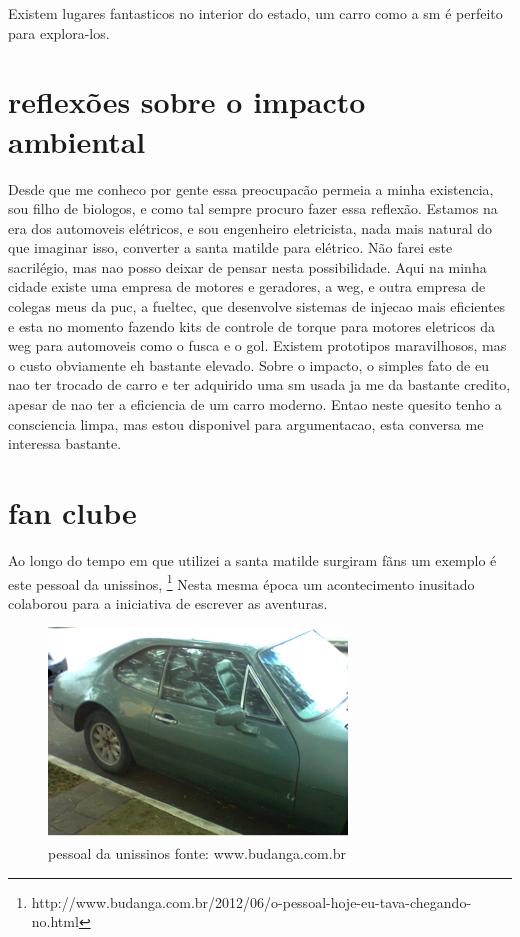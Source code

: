 \documentclass[a4paper]{report}
\begin{document}
Existem lugares fantasticos no interior do estado, um carro como a sm \'e perfeito para explora-los.


\section*{reflex\~oes sobre o impacto ambiental}

Desde que me conheco por gente essa preocupac\~ao permeia a minha existencia, sou filho de biologos, e como tal
sempre procuro fazer essa reflex\~ao.
Estamos na era dos automoveis el\'etricos, e sou engenheiro eletricista, nada mais natural do que imaginar isso,
converter a santa matilde para el\'etrico. N\~ao farei este sacril\'egio, mas nao posso deixar de pensar nesta possibilidade.
Aqui na minha cidade existe uma empresa de motores e geradores, a weg, e outra empresa de colegas meus da puc, a fueltec, que
desenvolve sistemas de injecao mais eficientes e esta no momento fazendo kits de controle de torque para motores eletricos da weg
para automoveis como o fusca e o gol.
Existem prototipos maravilhosos, mas o custo obviamente eh bastante elevado.
Sobre o impacto, o simples fato de eu nao ter trocado de carro e ter adquirido uma sm usada ja me da bastante credito, apesar de
nao ter a eficiencia de um carro moderno. Entao neste quesito tenho a consciencia limpa, mas estou disponivel para argumentacao,
esta conversa me interessa bastante.



\section*{fan clube}

Ao longo do tempo em que utilizei a santa matilde surgiram f\~ans um exemplo \'e este pessoal da unissinos, \footnote{http://www.budanga.com.br/2012/06/o-pessoal-hoje-eu-tava-chegando-no.html} 
Nesta mesma \'epoca um acontecimento inusitado colaborou para a iniciativa de escrever as aventuras.

\begin{figure}[!htb]
\centering
\includegraphics{Foto0296}
\caption{pessoal da unissinos fonte: www.budanga.com.br}
\label{fan clube SL }
\end{figure}
\end{document}
